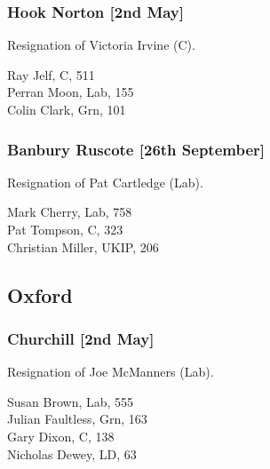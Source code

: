 \documentclass[a4paper,openany,10pt]{book}
\begin{document}
\subsubsection*{Hook Norton \hspace*{\fill}\nolinebreak[1]%
\enspace\hspace*{\fill}
[2nd May]}


Resignation of Victoria Irvine (C).



Ray Jelf, C, 511\\
Perran Moon, Lab, 155\\
Colin Clark, Grn, 101\\


\subsubsection*{Banbury Ruscote \hspace*{\fill}\nolinebreak[1]%
\enspace\hspace*{\fill}
[26th September]}


Resignation of Pat Cartledge (Lab).



Mark Cherry, Lab, 758\\
Pat Tompson, C, 323\\
Christian Miller, UKIP, 206\\


\subsection*{Oxford}

\subsubsection*{Churchill \hspace*{\fill}\nolinebreak[1]%
\enspace\hspace*{\fill}
[2nd May]}


Resignation of Joe McManners (Lab).



Susan Brown, Lab, 555\\
Julian Faultless, Grn, 163\\
Gary Dixon, C, 138\\
Nicholas Dewey, LD, 63\\
\end{document}
